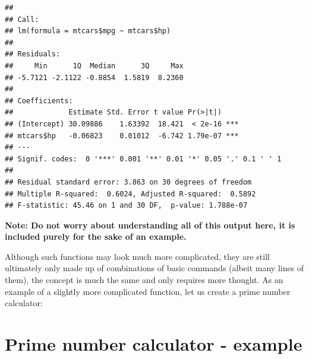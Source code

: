 \documentclass[
]{book}
\theoremstyle{definition}
\theoremstyle{definition}
\theoremstyle{definition}
\theoremstyle{definition}
\theoremstyle{remark}
\begin{document}
\begin{verbatim}
## 
## Call:
## lm(formula = mtcars$mpg ~ mtcars$hp)
## 
## Residuals:
##     Min      1Q  Median      3Q     Max 
## -5.7121 -2.1122 -0.8854  1.5819  8.2360 
## 
## Coefficients:
##             Estimate Std. Error t value Pr(>|t|)    
## (Intercept) 30.09886    1.63392  18.421  < 2e-16 ***
## mtcars$hp   -0.06823    0.01012  -6.742 1.79e-07 ***
## ---
## Signif. codes:  0 '***' 0.001 '**' 0.01 '*' 0.05 '.' 0.1 ' ' 1
## 
## Residual standard error: 3.863 on 30 degrees of freedom
## Multiple R-squared:  0.6024, Adjusted R-squared:  0.5892 
## F-statistic: 45.46 on 1 and 30 DF,  p-value: 1.788e-07
\end{verbatim}

\textbf{Note: Do not worry about understanding all of this output here, it is included purely for the sake of an example.}

Although such functions may look much more complicated, they are still ultimately only made up of combinations of basic commands (albeit many lines of them), the concept is much the same and only requires more thought. As an example of a slightly more complicated function, let us create a prime number calculator:

\hypertarget{prime-number-calculator---example}{%
\section{Prime number calculator - example}\label{prime-number-calculator---example}}
\end{document}
